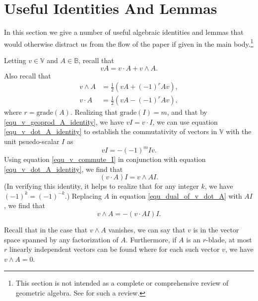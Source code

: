 \documentclass{birkjour}
\theoremstyle{definition}
\theoremstyle{remark}
\numberwithin{equation}{section}
\newcommand{\B}{\mathbb{B}}
\newcommand{\V}{\mathbb{V}}
\newcommand{\grade}{\mbox{grade}}
\begin{document}

\section{Useful Identities And Lemmas}\label{sec_useful_identities}

In this section we give a number of useful algebraic identities and lemmas that would
otherwise distract us from the flow of the paper if given in the main body.\footnote{This
section is not intended as a complete or comprehensive review of geometric algebra.
See \cite{} for such a review.}

Letting $v\in\V$ and $A\in\B$, recall that
\begin{equation}\label{equ_v_geoprod_A_identity}
vA = v\cdot A+v\wedge A.
\end{equation}
Also recall that
\begin{align}
v\wedge A &= \frac{1}{2}(vA+(-1)^rAv),\label{equ_v_wedge_A_identity} \\
v\cdot A &= \frac{1}{2}(vA-(-1)^rAv),\label{equ_v_dot_A_identity}
\end{align}
where $r=\grade(A)$.
Realizing that $\grade(I)=m$, and that by \eqref{equ_v_geoprod_A_identity}, we have $vI=v\cdot I$, we can use
equation \eqref{equ_v_dot_A_identity} to establish the commutativity of vectors in $\V$ with the unit psuedo-scalar $I$ as
\begin{equation}\label{equ_v_commute_I}
vI = -(-1)^mIv.
\end{equation}
Using equation \eqref{equ_v_commute_I} in conjunction with equation \eqref{equ_v_dot_A_identity}, we find that
\begin{equation}\label{equ_dual_of_v_dot_A}
(v\cdot A)I = v\wedge AI.
\end{equation}
(In verifying this identity, it helps to realize that for any integer $k$, we have $(-1)^k=(-1)^{-k}$.)
Replacing $A$ in equation \eqref{equ_dual_of_v_dot_A} with $AI$, we find that
\begin{equation}\label{equ_dual_of_v_dot_dual_A}
v\wedge A = -(v\cdot AI)I.
\end{equation}

Recall that in the case that $v\wedge A$ vanishes, we can say that $v$ is
in the vector space spanned by any factorization of $A$.  Furthermore,
if $A$ is an $r$-blade, at most $r$ linearly independent vectors can be
found where for each such vector $v$, we have $v\wedge A=0$.
\end{document}
